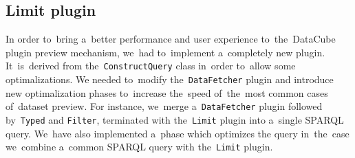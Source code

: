 \subsection{Limit plugin}
In order to~bring a~better performance and user experience to~the~DataCube plugin
preview mechanism, we~had to~implement a~completely new plugin. It~is~derived 
from the~\texttt{ConstructQuery} class in~order to~allow some optimalizations. 
We needed to~modify the~\texttt{DataFetcher} plugin and introduce new 
optimalization phases to~increase the~speed of~the~most common cases of~dataset 
preview. For instance, we~merge a~\texttt{DataFetcher} plugin followed by~\texttt{Typed} and \texttt{Filter}, terminated with the~\texttt{Limit} plugin 
into a~single SPARQL query. We~have also implemented a~phase which optimizes
the query in~the~case we~combine a~common SPARQL query with the~\texttt{Limit} plugin.
